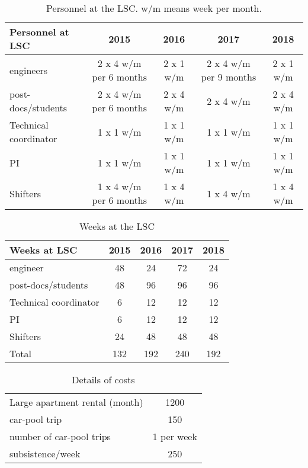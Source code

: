 \begin{table}[h!]
\begin{center}
\begin{tabular}{|l|c|c|c|c|}
\hline
Personnel at LSC &	2015 &	2016 &	2017 &	2018\\
\hline							
engineers &	2 x 4 w/m per 6 months &	2 x 1 w/m & 2 x 4 w/m per 9 months  &	2 x 1 w/m\\
post-docs/students & 	2 x 4 w/m per 6 months &	2 x 4 w/m & 2 x 4 w/m &	2 x 4 w/m \\
Technical coordinator &	1 x 1 w/m &1 x 1 w/m &1 x 1 w/m &	1 x 1 w/m \\
PI	& 1 x 1 w/m &	1 x 1 w/m &1 x 1 w/m &	1 x 1 w/m\\
Shifters &	1 x 4 w/m per 6 months &	1 x 4 w/m	& 1 x 4 w/m & 1 x 4 w/m \\
\hline\hline
\end{tabular}  
\caption{Personnel at the LSC. w/m means week per month. }
\label{tab.PersonelLSC}
\end{center}
\end{table}

\begin{table}[h!]
\begin{center}
\begin{tabular}{|l|c|c|c|c|}
\hline
Weeks at LSC &	2015 &	2016 &	2017 &	2018\\
\hline							
engineer& 	48 &	24 &	72 &	24 \\
post-docs/students & 	48	& 96 & 	96 &	96\\
Technical coordinator &	6	& 12	 & 12	 & 12\\
PI	& 6	& 12	 & 12	 & 12\\
Shifters &	24 &	48 &	48 &	48\\
\hline
Total &	132	&192 &	240 &	192\\
\hline\hline
\end{tabular}  
\caption{Weeks at the LSC}
\label{tab.WeeksLSC}
\end{center}
\end{table}

\begin{table}[h!]
\begin{center}
\begin{tabular}{|l|c|}
\hline				
Large apartment rental (month) &	1200	\\		
car-pool trip &	150 \\			
number of car-pool trips & 1 per week \\
subsistence/week &	250 \\
\hline \hline	
\end{tabular}  
\caption{Details of costs}
\label{tab.DetailsLSC}
\end{center}
\end{table}	


